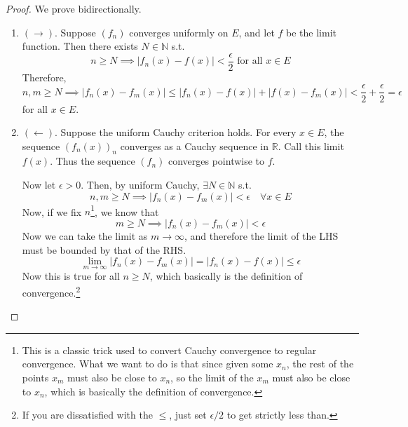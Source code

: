   \begin{proof}
    We prove bidirectionally. 
    \begin{enumerate}
      \item $(\rightarrow)$. Suppose $(f_n)$ converges uniformly on $E$, and let $f$ be the limit function. Then there exists $N \in \mathbb{N}$ s.t. 
      \begin{equation}
        n \geq N \implies |f_n (x) - f(x)| < \frac{\epsilon}{2} \text{ for all } x \in E
      \end{equation} 
      Therefore, 
      \begin{equation}
        n, m \geq N \implies |f_n (x) - f_m (x)| \leq |f_n (x) - f(x)| + |f(x) - f_m (x)| < \frac{\epsilon}{2} + \frac{\epsilon}{2} = \epsilon 
      \end{equation}
      for all $x \in E$. 

      \item $(\leftarrow)$. Suppose the uniform Cauchy criterion holds. For every $x \in E$, the sequence $(f_n (x))_n$ converges as a Cauchy sequence in $\mathbb{R}$. Call this limit $f(x)$. Thus the sequence $(f_n)$ converges pointwise to $f$. 

      Now let $\epsilon > 0$. Then, by uniform Cauchy, $\exists N \in \mathbb{N}$ s.t. 
      \begin{equation}
        n, m \geq N \implies |f_n (x) - f_m (x)| < \epsilon \quad \forall x \in E
      \end{equation}
      Now, if we fix $n$\footnote{This is a classic trick used to convert Cauchy convergence to regular convergence. What we want to do is that since given some $x_n$, the rest of the points $x_m$ must also be close to $x_n$, so the limit of the $x_m$ must also be close to $x_n$, which is basically the definition of convergence.}, we know that 
      \begin{equation}
        m \geq N \implies |f_n (x) - f_m (x)| < \epsilon 
      \end{equation}
      Now we can take the limit as $m \to \infty$, and therefore the limit of the LHS must be bounded by that of the RHS. 
      \begin{equation}
        \lim_{m \to \infty} |f_n (x) - f_m (x)| = |f_n (x) - f(x)| \leq \epsilon
      \end{equation}
      Now this is true for all $n \geq N$, which basically is the definition of convergence.\footnote{If you are dissatisfied with the $\leq$, just set $\epsilon/2$ to get strictly less than. }
    \end{enumerate}
  \end{proof}

